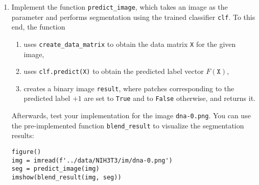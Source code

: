 \documentclass[12pt,a4paper]{article}
\begin{document}
\begin{enumerate}
\begin{enumerate}
    \end{enumerate}
    \item Implement the function \texttt{predict\_image}, which takes an image as the parameter and performs segmentation using the trained classifier \texttt{clf}. To this end, the function
    \begin{enumerate}
        \item uses \texttt{create\_data\_matrix} to obtain the data matrix \texttt{X} for the given image,
        \item uses \texttt{clf.predict(X)} to obtain the predicted label vector $F\left(\texttt{X}\right)$,
        \item creates a binary image \texttt{result}, where patches corresponding to the predicted label $+1$ are set to \texttt{True} and to \texttt{False} otherwise, and returns it.
    \end{enumerate}
    Afterwards, test your implementation for the image \texttt{dna-0.png}. You can use the pre-implemented function \texttt{blend\_result} to visualize the segmentation results:
\begin{Verbatim}[frame=single]
figure()
img = imread(f'../data/NIH3T3/im/dna-0.png')
seg = predict_image(img)
imshow(blend_result(img, seg))
\end{Verbatim}

\end{enumerate}
\end{document}
